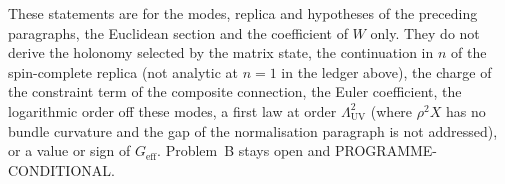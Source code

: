 These statements are for the modes, replica and hypotheses of the preceding paragraphs, the Euclidean section and the coefficient of \(W\) only. They do not derive the holonomy selected by the matrix state, the continuation in \(n\) of the spin-complete replica (not analytic at \(n=1\) in the ledger above), the charge of the constraint term of the composite connection, the Euler coefficient, the logarithmic order off these modes, a first law at order \(\Lambda_{\mathrm{UV}}^2\) (where \(\rho^2X\) has no bundle curvature and the gap of the normalisation paragraph is not addressed), or a value or sign of \(G_{\mathrm{eff}}\). Problem~B stays open and PROGRAMME-CONDITIONAL.
